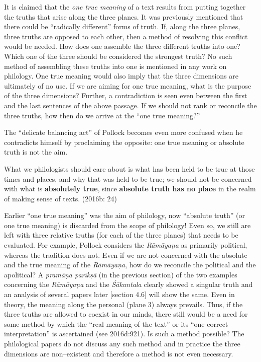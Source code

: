 It is claimed that the \textit{one true meaning} of a text results from putting together the truths that arise along the three planes. It was previously mentioned that there could be “radically different” forms of truth. If, along the three planes, three truths are opposed to each other, then a method of resolving this conflict would be needed. How does one assemble the three different truths into one? Which one of the three should be considered the strongest truth? No such method of assembling these truths into one is mentioned in any work on philology. One true meaning would also imply that the three dimensions are ultimately of no use. If we are aiming for one true meaning, what is the purpose of the three dimensions? Further, a contradiction is seen even between the first and the last sentences of the above passage. If we should not rank or reconcile the three truths, how then do we arrive at the “one true meaning?”

\newpage

The “delicate balancing act” of Pollock becomes even more confused when he contradicts himself by proclaiming the opposite: one true meaning or absolute truth is not the aim.

\begin{myquote}
What we philologists should care about is what has been held to be true at those times and places, and why that was held to be true; we should not be concerned with what is \textbf{absolutely true}, since \textbf{absolute truth has no place} in the realm of making sense of texts. (2016b: 24)
\end{myquote}

Earlier “one true meaning” was the aim of philology, now “absolute truth” (or one true meaning) is discarded from the scope of philology! Even so, we still are left with three relative truths (for each of the three planes) that needs to be evaluated. For example, Pollock considers the \textit{Rāmāyaṇa} as primarily political, whereas the tradition does not. Even if we are not concerned with the absolute and the true meaning of the \textit{Rāmāyaṇa}, how do we reconcile the political and the apolitical? A \textit{pramāṇa parīkṣā} (in the previous section) of the two examples concerning the \textit{Rāmāyaṇa} and the \textit{Śākuntala }clearly showed a singular truth and an analysis of several papers later [section 4.6] will show the same. Even in theory, the meaning along the personal (plane 3) always prevails. Thus, if the three truths are allowed to coexist in our minds, there still would be a need for some method by which the “real meaning of the text” or its “one correct interpretation” is ascertained (see 2016d:921). Is such a method possible? The philological papers do not discuss any such method and in practice the three dimensions are non–existent and therefore a method is not even necessary.

